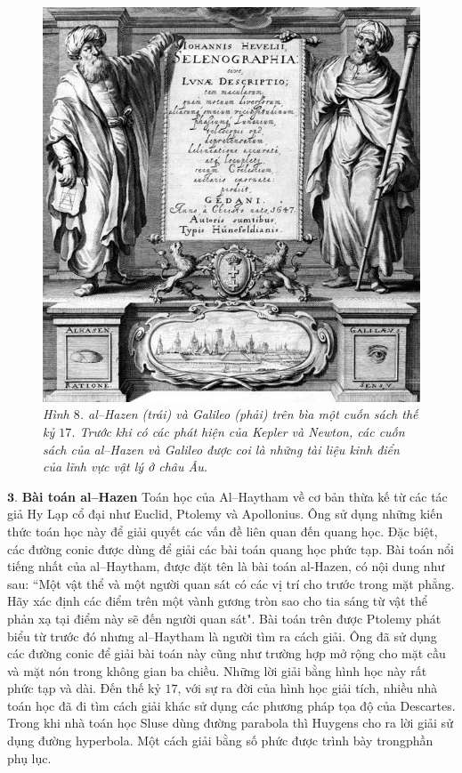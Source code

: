 \begin{multicols}{2}
\begin{figure}[H]
		\includegraphics[width= 1\linewidth]{9}
		\caption{\small\textit{\color{lichsutoanhoc}Hình $8$. al--Hazen (trái) và Galileo (phải) trên bìa một cuốn sách thế kỷ $17$. Trước khi có các phát hiện của Kepler và Newton, các cuốn sách của al--Hazen và Galileo được coi là những tài liệu kinh điển của lĩnh vực vật lý ở châu Âu.}}
		\vspace*{-10pt}
	\end{figure}
	$\pmb{3.}$ \textbf{\color{lichsutoanhoc}Bài toán al--Hazen}
	\vskip 0.1cm
	Toán học của Al--Haytham về cơ bản thừa kế từ các tác giả Hy Lạp cổ đại như Euclid, Ptolemy và Apollonius. Ông sử dụng những kiến thức toán học này để giải quyết các vấn đề liên quan đến quang học. Đặc biệt, các đường conic được dùng để giải các bài toán quang học phức tạp.
	\vskip 0.1cm
	Bài toán nổi tiếng nhất của al--Haytham, được đặt tên là bài toán al-Hazen, có nội dung như sau:
	\vskip 0.1cm
	``Một vật thể và một người quan sát có các vị trí cho trước trong mặt phẳng. Hãy xác định các điểm trên một vành gương tròn sao cho tia sáng từ vật thể phản xạ tại điểm này sẽ đến người quan sát".
	\vskip 0.1cm
	Bài toán trên được Ptolemy phát biểu từ trước đó nhưng al--Haytham là người tìm ra cách giải. Ông đã sử dụng các đường conic để giải bài toán này cũng như trường hợp mở rộng cho mặt cầu và mặt nón trong không gian ba chiều. Những lời giải bằng hình học này rất phức tạp và dài. Đến thế kỷ $17$, với sự ra đời của hình học giải tích, nhiều nhà toán học đã đi tìm cách giải khác sử dụng các phương pháp tọa độ của Descartes. Trong khi nhà toán học Sluse dùng đường parabola thì Huygens cho ra lời giải sử dụng đường hyperbola. Một cách giải bằng số phức được trình bày trongphần phụ lục.

\end{multicols}
